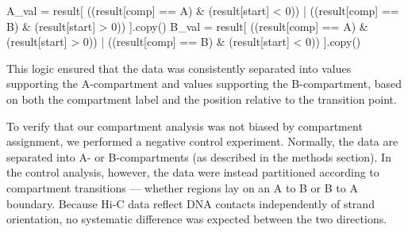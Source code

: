 \documentclass[
  a4paper,
  openany]{scrbook}
\newenvironment{Shaded}{\begin{snugshade}}{\end{snugshade}}
\newcommand{\DecValTok}[1]{\textcolor[rgb]{0.69,0.50,0.00}{#1}}
\newcommand{\NormalTok}[1]{\textcolor[rgb]{0.12,0.11,0.11}{#1}}
\newcommand{\OperatorTok}[1]{\textcolor[rgb]{0.12,0.11,0.11}{#1}}
\newcommand{\StringTok}[1]{\textcolor[rgb]{0.75,0.01,0.01}{#1}}
\begin{document}
\begin{Shaded}
\begin{Highlighting}[]
\NormalTok{    A\_val }\OperatorTok{=}\NormalTok{ result[}
\NormalTok{        ((result[}\StringTok{\textquotesingle{}comp\textquotesingle{}}\NormalTok{] }\OperatorTok{==} \StringTok{\textquotesingle{}A\textquotesingle{}}\NormalTok{) }\OperatorTok{\&}\NormalTok{ (result[}\StringTok{\textquotesingle{}start\textquotesingle{}}\NormalTok{] }\OperatorTok{\textless{}} \DecValTok{0}\NormalTok{)) }\OperatorTok{|}
\NormalTok{        ((result[}\StringTok{\textquotesingle{}comp\textquotesingle{}}\NormalTok{] }\OperatorTok{==} \StringTok{\textquotesingle{}B\textquotesingle{}}\NormalTok{) }\OperatorTok{\&}\NormalTok{ (result[}\StringTok{\textquotesingle{}start\textquotesingle{}}\NormalTok{] }\OperatorTok{\textgreater{}} \DecValTok{0}\NormalTok{))}
\NormalTok{    ].copy()}
\NormalTok{    B\_val }\OperatorTok{=}\NormalTok{ result[}
\NormalTok{        ((result[}\StringTok{\textquotesingle{}comp\textquotesingle{}}\NormalTok{] }\OperatorTok{==} \StringTok{\textquotesingle{}A\textquotesingle{}}\NormalTok{) }\OperatorTok{\&}\NormalTok{ (result[}\StringTok{\textquotesingle{}start\textquotesingle{}}\NormalTok{] }\OperatorTok{\textgreater{}} \DecValTok{0}\NormalTok{)) }\OperatorTok{|}
\NormalTok{        ((result[}\StringTok{\textquotesingle{}comp\textquotesingle{}}\NormalTok{] }\OperatorTok{==} \StringTok{\textquotesingle{}B\textquotesingle{}}\NormalTok{) }\OperatorTok{\&}\NormalTok{ (result[}\StringTok{\textquotesingle{}start\textquotesingle{}}\NormalTok{] }\OperatorTok{\textless{}} \DecValTok{0}\NormalTok{))}
\NormalTok{    ].copy()}
\end{Highlighting}
\end{Shaded}

This logic ensured that the data was consistently separated into values
supporting the A-compartment and values supporting the B-compartment,
based on both the compartment label and the position relative to the
transition point.

To verify that our compartment analysis was not biased by compartment
assignment, we performed a negative control experiment. Normally, the
data are separated into A- or B-compartments (as described in the
methods section). In the control analysis, however, the data were
instead partitioned according to compartment transitions --- whether
regions lay on an A to B or B to A boundary. Because Hi-C data reflect
DNA contacts independently of strand orientation, no systematic
difference was expected between the two directions.
\end{document}

